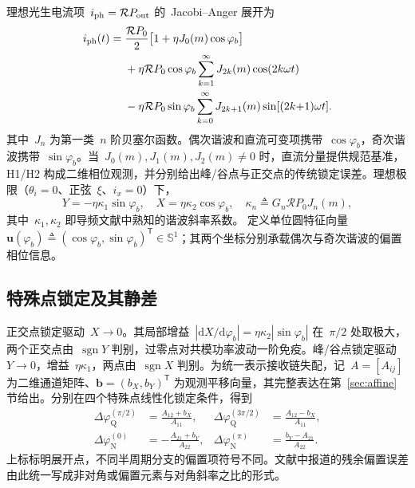 \documentclass[journal]{IEEEtran}
\theoremstyle{plain}
\theoremstyle{remark}
\newcommand{\uv}{\mathbf{u}}
\newcommand{\bv}{\mathbf{b}}
\newcommand{\T}{\mathsf{T}}
\begin{document}
理想光生电流项~$i_{\rm ph}=\mathcal{R}P_{\rm out}$ 的~Jacobi--Anger 展开为
\begin{equation*}
\begin{aligned}
i_{\rm ph}(t)
={}&\frac{\mathcal{R} P_0}{2}
\bigl[1+\eta J_0(m)\cos\varphi_b\bigr]\\
&+\eta\mathcal{R} P_0\cos\varphi_b
\sum_{k=1}^{\infty}J_{2k}(m)\cos(2k\omega t)\\
&-\eta\mathcal{R} P_0\sin\varphi_b
\sum_{k=0}^{\infty}J_{2k+1}(m)\sin[(2k{+}1)\omega t].
\end{aligned}
\end{equation*}
其中~$J_n$ 为第一类~$n$ 阶贝塞尔函数。偶次谐波和直流可变项携带~$\cos\varphi_b$，奇次谐波携带~$\sin\varphi_b$。当~$J_0(m),J_1(m),J_2(m)\neq0$ 时，直流分量提供规范基准，H1/H2 构成二维相位观测，并分别给出峰/谷点与正交点的传统锁定误差。理想极限（$\theta_i{=}0$、正弦~$\xi$、$i_x{=}0$）下，
\begin{equation}
Y=-\eta\kappa_1\sin\varphi_b,\quad X=\eta\kappa_2\cos\varphi_b,\quad
\kappa_n\triangleq G_n\mathcal{R} P_0 J_n(m),
\label{eq:ideal}
\end{equation}
其中~$\kappa_1,\kappa_2$ 即导频文献中熟知的谐波斜率系数。
定义单位圆特征向量
$\uv(\varphi_b)\triangleq(\cos\varphi_b,\sin\varphi_b)^{\T}\in\mathbb{S}^1$；其两个坐标分别承载偶次与奇次谐波的偏置相位信息。

\subsection{特殊点锁定及其静差}
\label{sec:conventional}
正交点锁定驱动~$X\to 0$。其局部增益~$|\mathrm{d}X/\mathrm{d}\varphi_b|=\eta\kappa_2|\sin\varphi_b|$ 在~$\pi/2$ 处取极大，两个正交点由~$\operatorname{sgn}Y$ 判别，过零点对共模功率波动一阶免疫。峰/谷点锁定驱动~$Y\to0$，增益~$\eta\kappa_1$，两点由~$\operatorname{sgn}X$ 判别。为统一表示接收链失配，记~$A=[A_{ij}]$ 为二维通道矩阵、$\bv=(b_X,b_Y)^{\T}$ 为观测平移向量，其完整表达在第~\ref{sec:affine} 节给出。分别在四个特殊点线性化锁定条件，得到
\begin{equation}
\begin{aligned}
\Delta\varphi_{\mathrm Q}^{(\pi/2)}&=\frac{A_{12}+b_X}{A_{11}},&
\Delta\varphi_{\mathrm Q}^{(3\pi/2)}&=\frac{A_{12}-b_X}{A_{11}},\\
\Delta\varphi_{\mathrm N}^{(0)}&=-\frac{A_{21}+b_Y}{A_{22}},&
\Delta\varphi_{\mathrm N}^{(\pi)}&=\frac{b_Y-A_{21}}{A_{22}}.
\end{aligned}
\label{eq:staticQ}
\end{equation}
上标标明展开点，不同半周期分支的偏置项符号不同。文献中报道的残余偏置误差由此统一写成非对角或偏置元素与对角斜率之比的形式。
\end{document}
